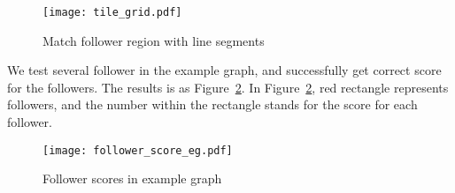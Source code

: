 \begin{figure}[htbp]
	  \centering
	  \texttt{[image: tile\_grid.pdf]}
	  \caption{Match follower region with line segments}
	  \label{tile_grid}
\end{figure}

We test several follower in the example graph, and successfully get correct score for the followers. The results is as Figure~\ref{follower_score_eg}. In Figure~\ref{follower_score_eg}, red rectangle represents followers, and the number within the rectangle stands for the score for each follower.

\begin{figure}[htbp]
	  \centering
	  \texttt{[image: follower\_score\_eg.pdf]}
	  \caption{Follower scores in example graph}
	  \label{follower_score_eg}
\end{figure}